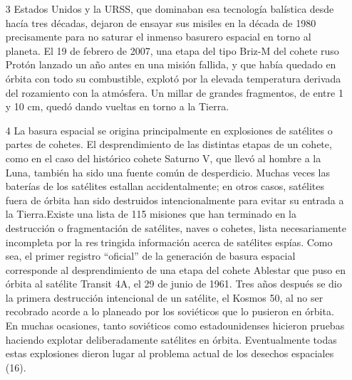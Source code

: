 \documentclass[12pt,letterpaper]{article}
\begin{document}
\begin{multicols}{2}
\begin{itemize}
    \item[3]Estados Unidos y la URSS, que dominaban esa tecnología balística desde hacía tres décadas, dejaron de ensayar sus misiles en la década de 1980 precisamente para no saturar el inmenso basurero espacial en torno al planeta. El 19 de febrero de 2007, una etapa del tipo Briz-M del cohete ruso Protón lanzado un año antes en una misión fallida, y que había quedado en órbita con todo su combustible, explotó por la elevada temperatura derivada del rozamiento con la atmósfera. Un millar de grandes fragmentos, de entre 1 y 10 cm, quedó dando vueltas en torno a la Tierra.
    \item [4] La basura espacial se origina principalmente en explosiones de satélites o partes de cohetes. El desprendimiento de las distintas etapas de un cohete, como en el caso del histórico cohete Saturno V, que llevó al hombre a la Luna, también ha sido una fuente común de desperdicio. Muchas veces las baterías de los satélites estallan accidentalmente; en otros casos, satélites fuera de órbita han sido destruidos intencionalmente para evitar su entrada a la Tierra.Existe una lista de 115 misiones que han terminado en la destrucción o fragmentación de satélites, naves o cohetes, lista necesariamente incompleta por la restringida información acerca de satélites espías. Como sea, el primer registro “oficial” de la generación de basura espacial corresponde al desprendimiento de una etapa del cohete Ablestar que puso en órbita al satélite Transit 4A, el 29 de junio de 1961. Tres años después se dio la primera destrucción intencional de un satélite, el Kosmos 50, al no ser recobrado acorde a lo planeado por los soviéticos que lo pusieron en órbita. En muchas ocasiones, tanto soviéticos como estadounidenses hicieron pruebas haciendo explotar deliberadamente satélites en órbita. Eventualmente todas estas explosiones dieron lugar al problema actual de los desechos espaciales (16). 

\end{itemize}
\end{multicols}
\end{document}
